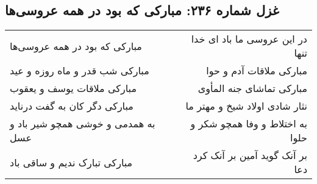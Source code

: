 \begin{center}
\section*{غزل شماره ۲۳۶: مبارکی که بود در همه عروسی‌ها}
\label{sec:0236}
\begin{longtable}{l p{0.5cm} r}
مبارکی که بود در همه عروسی‌ها
&&
در این عروسی ما باد ای خدا تنها
\\
مبارکی شب قدر و ماه روزه و عید
&&
مبارکی ملاقات آدم و حوا
\\
مبارکی ملاقات یوسف و یعقوب
&&
مبارکی تماشای جنه المأوی
\\
مبارکی دگر کان به گفت درناید
&&
نثار شادی اولاد شیخ و مهتر ما
\\
به همدمی و خوشی همچو شیر باد و عسل
&&
به اختلاط و وفا همچو شکر و حلوا
\\
مبارکی تبارک ندیم و ساقی باد
&&
بر آنک گوید آمین بر آنک کرد دعا
\\
\end{longtable}
\end{center}

